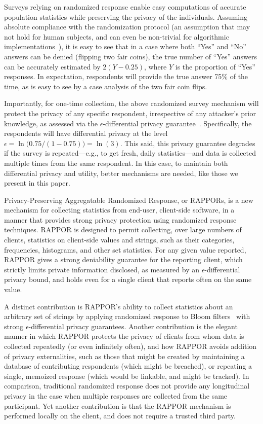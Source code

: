 \documentclass{sig-alternate-2013}
\newcommand\RAPPOR{{RAPPOR}}
\begin{document}
Surveys relying on randomized response enable easy computations of accurate population statistics while preserving the privacy of the individuals. Assuming absolute compliance with the randomization protocol (an assumption that may not hold for human subjects, and can even be non-trivial for algorithmic implementations~\cite{mironov-CCS12}), it is easy to see that in a case where both ``Yes'' and ``No'' answers can be denied (flipping two fair coins), the true number of ``Yes'' answers can be accurately estimated by $2(Y - 0.25)$, where $Y$ is the proportion of ``Yes'' responses. 
In expectation,
respondents will provide the true answer 75\% of the time,
as is easy to see by
a case analysis of the two fair coin flips.

Importantly,
for one-time collection,
the above randomized survey mechanism
will protect the privacy
of any specific respondent,
irrespective of any attacker's prior knowledge, 
as assessed via the $\epsilon$-differential privacy guarantee~\cite{dwork06}.
Specifically,
the respondents will have
differential privacy at the level $\epsilon = \ln\bigl(0.75 / (1 - 0.75)\bigr) = \ln(3)$.
This said,
this privacy guarantee degrades
if the survey is repeated---e.g.,
to get fresh, daily statistics---and
data is collected multiple times from the same respondent.
In this case,
to maintain both differential privacy and utility,
better mechanisms are needed,
like those we present in this paper.


Privacy-Preserving Aggregatable Randomized Response, 
or \RAPPOR{}s, is a new mechanism for collecting statistics from end-user, client-side software, 
in a manner that provides strong privacy protection
using randomized response techniques.  
\RAPPOR{} is designed to permit collecting, over large numbers of clients, 
statistics on client-side values and strings, 
such as their categories, frequencies, histograms, 
and other set statistics.
For any given value reported,
\RAPPOR{}
gives 
a strong deniability guarantee for the reporting client,
which strictly limits private information disclosed,
as measured by an $\epsilon$-differential privacy bound,
and holds even for 
a single client that reports often on the same value.

A distinct contribution is \RAPPOR{}'s ability 
to collect statistics about an arbitrary set of strings 
by applying randomized response to Bloom filters~\cite{bloom} 
with strong $\epsilon$-differential privacy guarantees. 
Another contribution is the elegant manner
in which \RAPPOR{}
protects the privacy of clients 
from whom data is collected repeatedly (or even infinitely often), and
how \RAPPOR{}
avoids addition of privacy externalities,
such as those that might be created by
maintaining a database of contributing respondents (which might be breached),
or repeating a single, memoized response (which would be linkable, and might be tracked).
In comparison,
traditional randomized response does not provide any longitudinal privacy 
in the case when multiple responses are collected from the same participant. 
Yet another contribution is that the \RAPPOR{}  mechanism is performed locally on the client, and does not require a trusted third party.
\end{document}
